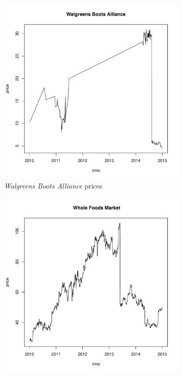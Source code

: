 \documentclass{article}
\begin{document}
\begin{figure}[htb!]
  \centering
  \begin{subfigure}{0.45\textwidth}
    \includegraphics[width=\textwidth]{WBA_price.pdf}
    \caption{{\it Walgreens Boots Alliance} prices}
    \label{fig:EBA_prices}
  \end{subfigure}
  \begin{subfigure}{0.45\textwidth}
    \includegraphics[width=\textwidth]{WFM_price.pdf}

\end{subfigure}
\end{figure}
\end{document}
